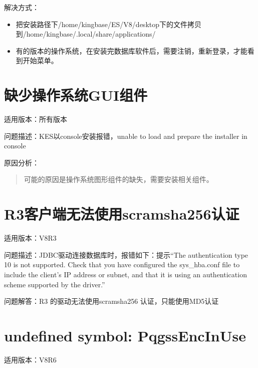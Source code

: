 \documentclass[a4,10pt,oneside,english]{sphinxmanual}
\begin{document}
解决方式：
\begin{itemize}
\item {} 
把安装路径下/home/kingbase/ES/V8/desktop下的文件拷贝到/home/kingbase/.local/share/applications/

\item {} 
有的版本的操作系统，在安装完数据库软件后，需要注销，重新登录，才能看到开始菜单。

\end{itemize}


\section{缺少操作系统GUI组件}
\label{\detokenize{tools:gui}}
适用版本：所有版本

问题描述：KES以console安装报错，unable to load and prepare the installer in console

原因分析：
\begin{quote}

可能的原因是操作系统图形组件的缺失，需要安装相关组件。

\begin{sphinxVerbatim}[commandchars=\\\{\}]
  
  
  
\end{sphinxVerbatim}
\end{quote}


\section{R3客户端无法使用scram\sphinxhyphen{}sha\sphinxhyphen{}256认证}
\label{\detokenize{tools:r3scram-sha-256}}
适用版本：V8R3

问题描述：JDBC驱动连接数据库时，报错如下：提示“The authentication type 10 is not supported. Check that you have configured the sys\_hba.conf file to include the client's IP address or subnet, and that it is using an authentication scheme supported by the driver.”

问题解答：R3 的驱动无法使用scram\sphinxhyphen{}sha\sphinxhyphen{}256 认证，只能使用MD5认证


\section{undefined symbol: PqgssEncInUse}
\label{\detokenize{tools:undefined-symbol-pqgssencinuse}}
适用版本：V8R6
\end{document}
